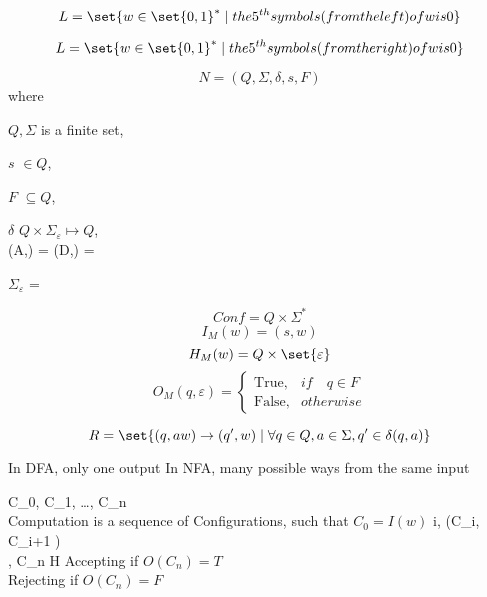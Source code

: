
\begin{example}
    \[
        L = \set{w \in \set{0,1}^* \mid the 5^{th} symbols (from the left) of w is 0}
    \]

    \[
    L = \set{w \in \set{0,1}^* \mid the 5^{th} symbols (from the right) of w is 0}

    \]
\end{example}

\begin{definition}[NFA]
    \label{def:NFA}
    \[
        N = (Q,\Sigma, \delta,s,F)
    \]
    where
    \begin{compactdesc}
    \item[$Q,\Sigma$]      is a finite set,   
    \item[$s$]      $\in Q$,    
    \item[$F$]      $\subseteq Q$,  
    \item[$\delta$]
        $Q \times \Sigma_\varepsilon \mapsto Q$, \\
        \delta(A,\varepsilon) = 
        \delta(D,\varepsilon) = \emptyset

    \item[$\Sigma_\varepsilon$] = \Sigma \cup \set{\varepsilon}
    \end{compactdesc}
\end{definition}

    \[
        Conf = Q \times \Sigma^*
    \]
    \[
        I_M(w) = (s,w)
    \]
    \[
        H_M(w) = Q \times \set{\varepsilon} 
    \]
    \[
        O_M(q,\varepsilon)
        = \begin{cases}
            \text{True},  & if \quad q \in F \\
            \text{False}, & otherwise 
        \end{cases}
    \]

    \[
        R = \set{(q,aw) \rightarrow (q',w) \mid 
            \forall q \in Q, a \in \Sigma, q' \in \delta(q,a)}
    \]

    In DFA, only one output
    In NFA, many possible ways from the same input

    C_0, C_1, \dots , C_n \\
    Computation is a sequence of Configurations, such that $C_0 = I(w)$
    \forall i, (C_i, C_{i+1} \in {}) \\
    [C_i \mapsto C_{i+1}], C_n \in H
    Accepting if $ O(C_n) = T $\\
    Rejecting if $O(C_n) = F $\\

